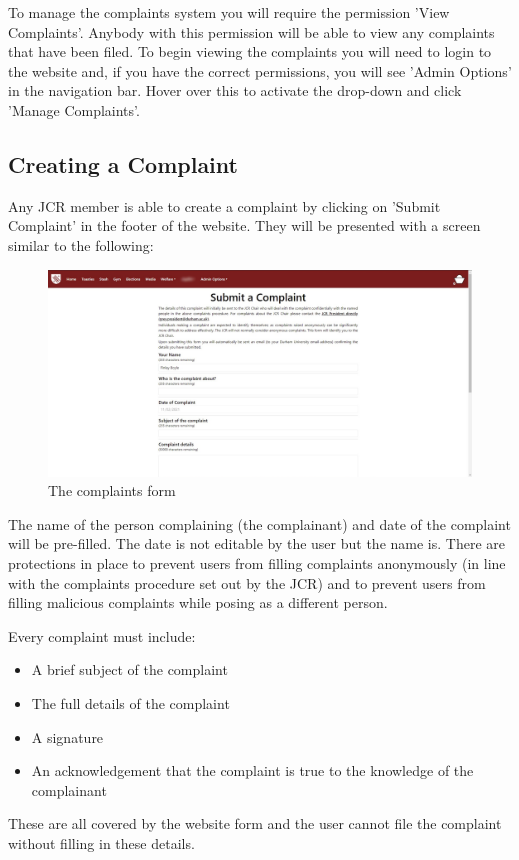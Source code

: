 \documentclass{article}
\begin{document}
To manage the complaints system you will require the permission 'View Complaints'. Anybody with this permission will be able to view any complaints that have been filed. To begin viewing the complaints you will need to login to the website and, if you have the correct permissions, you will see 'Admin Options' in the navigation bar. Hover over this to activate the drop-down and click 'Manage Complaints'.
\subsection{Creating a Complaint}
Any JCR member is able to create a complaint by clicking on 'Submit Complaint' in the footer of the website. They will be presented with a screen similar to the following:
\begin{figure}[H]
    \centering
    \includegraphics[width=\textwidth,height=\textheight,keepaspectratio]{complaints/complaints_form.png}
    \caption{The complaints form}
    \label{fig:complaints_form}
\end{figure}
The name of the person complaining (the complainant) and date of the complaint will be pre-filled. The date is not editable by the user but the name is. There are protections in place to prevent users from filling complaints anonymously (in line with the complaints procedure set out by the JCR) and to prevent users from filling malicious complaints while posing as a different person.

Every complaint must include:
\begin{itemize}
    \item A brief subject of the complaint
    \item The full details of the complaint
    \item A signature
    \item An acknowledgement that the complaint is true to the knowledge of the complainant
\end{itemize}
These are all covered by the website form and the user cannot file the complaint without filling in these details. 
\end{document}
